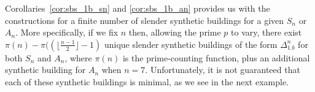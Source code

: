 \documentclass[12pt]{amsart}
\theoremstyle{plain}
\theoremstyle{definition}
\theoremstyle{remark}
\numberwithin{equation}{section}
\newcommand{\red}[1]{\textcolor{red}{#1}}
\begin{document}
Corollaries~\ref{cor:sbs_1b_sn} and \ref{cor:sbs_1b_an} provides us with the constructions for a finite number of slender synthetic buildings for a given $S_n$ or $A_n$. More specifically, if we fix $n$ then, allowing the prime $p$ to vary, there exist $\pi(n)-\pi((\lfloor\frac{n-1}{2}\rfloor-1)$ unique slender synthetic buildings of the form $\Delta^n_{1.b}$ for both $S_n$ and $A_n$, where $\pi(n)$ is the prime-counting function, 
plus an additional synthetic building for $A_n$ when $n=7$. Unfortunately, it is not guaranteed that each of these synthetic buildings is minimal, as we see in the next example. 
\end{document}
